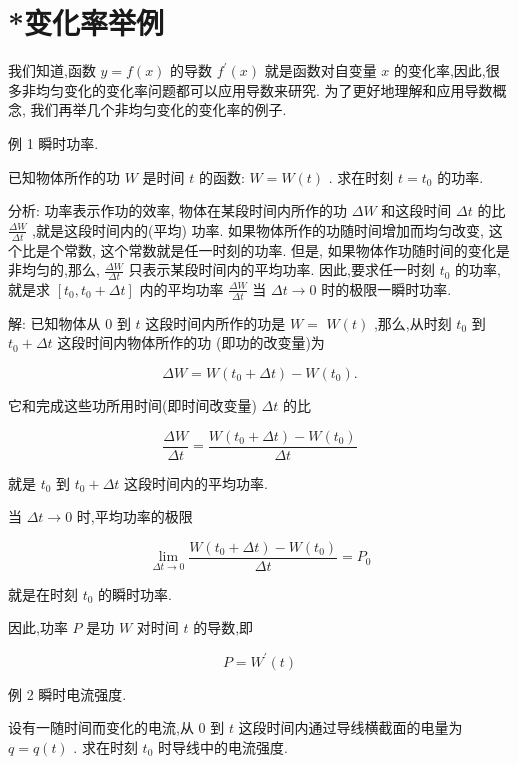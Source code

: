 \documentclass[lang=cn,newtx,12pt,scheme=chinese]{elegantbook}
\begin{document}
\section*{*变化率举例}

我们知道,函数 \(y = f\left( x\right)\) 的导数 \({f}^{\prime }\left( x\right)\) 就是函数对自变量 \(x\) 的变化率,因此,很多非均匀变化的变化率问题都可以应用导数来研究. 为了更好地理解和应用导数概念, 我们再举几个非均匀变化的变化率的例子.

例 1 瞬时功率.

已知物体所作的功 \(W\) 是时间 \(t\) 的函数: \(W = W\left( t\right)\) . 求在时刻 \(t = {t}_{0}\) 的功率.

分析: 功率表示作功的效率, 物体在某段时间内所作的功 \({\Delta W}\) 和这段时间 \({\Delta t}\) 的比 \(\frac{\Delta W}{\Delta t}\) ,就是这段时间内的(平均) 功率. 如果物体所作的功随时间增加而均匀改变, 这个比是个常数, 这个常数就是任一时刻的功率. 但是, 如果物体作功随时间的变化是非均匀的,那么, \(\frac{\Delta W}{\Delta t}\) 只表示某段时间内的平均功率. 因此,要求任一时刻 \({t}_{0}\) 的功率,就是求 \(\left\lbrack {{t}_{0},{t}_{0} + {\Delta t}}\right\rbrack\) 内的平均功率 \(\frac{\Delta W}{\Delta t}\) 当 \({\Delta t} \rightarrow 0\) 时的极限一瞬时功率.

解: 已知物体从 0 到 \(t\) 这段时间内所作的功是 \(W =\) \(W\left( t\right)\) ,那么,从时刻 \({t}_{0}\) 到 \({t}_{0} + {\Delta t}\) 这段时间内物体所作的功 (即功的改变量)为

\[
{\Delta W} = W\left( {{t}_{0} + {\Delta t}}\right) - W\left( {t}_{0}\right) .
\]

它和完成这些功所用时间(即时间改变量) \({\Delta t}\) 的比

\[
\frac{\Delta W}{\Delta t} = \frac{W\left( {{t}_{0} + {\Delta t}}\right) - W\left( {t}_{0}\right) }{\Delta t}
\]

就是 \({t}_{0}\) 到 \({t}_{0} + {\Delta t}\) 这段时间内的平均功率.

当 \({\Delta t} \rightarrow 0\) 时,平均功率的极限

\[
\mathop{\lim }\limits_{{{\Delta t} \rightarrow 0}}\frac{W\left( {{t}_{0} + {\Delta t}}\right) - W\left( {t}_{0}\right) }{\Delta t} = {P}_{0}
\]

就是在时刻 \({t}_{0}\) 的瞬时功率.

因此,功率 \(P\) 是功 \(W\) 对时间 \(t\) 的导数,即

\[
P = {W}^{\prime }\left( t\right)
\]

例 2 瞬时电流强度.

设有一随时间而变化的电流,从 0 到 \(t\) 这段时间内通过导线横截面的电量为 \(q = q\left( t\right)\) . 求在时刻 \({t}_{0}\) 时导线中的电流强度.
\end{document}
